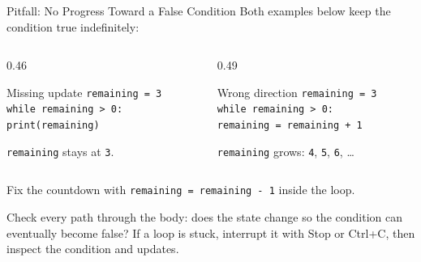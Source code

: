 \documentclass[aspectratio=169,10pt]{beamer}
\begin{document}
\begin{frame}[t]{Pitfall: No Progress Toward a False Condition}
  \small
  Both examples below keep the condition true indefinitely:
  \begin{columns}[T,onlytextwidth]
    \begin{column}{0.46\textwidth}
      \begin{alertblock}{Missing update}
        \texttt{remaining = 3}\\
        \texttt{while remaining > 0:}\\
        \hspace{0.18in}\texttt{print(remaining)}
      \end{alertblock}
      \texttt{remaining} stays at \texttt{3}.
    \end{column}
    \begin{column}{0.49\textwidth}
      \begin{alertblock}{Wrong direction}
        \texttt{remaining = 3}\\
        \texttt{while remaining > 0:}\\
        \hspace{0.18in}\texttt{remaining = remaining + 1}
      \end{alertblock}
      \texttt{remaining} grows: \texttt{4}, \texttt{5}, \texttt{6}, \ldots
    \end{column}
  \end{columns}
  Fix the countdown with \texttt{remaining = remaining - 1} inside the loop.
  \begin{keyidea}
    Check every path through the body: does the state change so the condition can eventually become false? If a loop is stuck, interrupt it with Stop or Ctrl+C, then inspect the condition and updates.
  \end{keyidea}
\end{frame}
\end{document}
